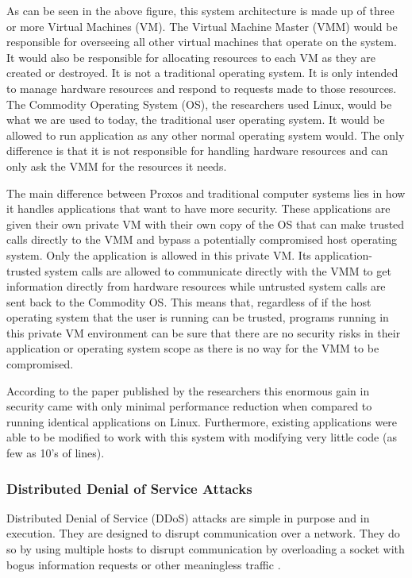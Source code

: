 \documentclass[conference, 12pt]{IEEEtran}
\begin{document}
As can be seen in the above figure, this system architecture is made up of three or more Virtual Machines (VM). The Virtual Machine Master (VMM) would be responsible for overseeing all other virtual machines that operate on the system. It would also be responsible for allocating resources to each VM as they are created or destroyed\cite{Richard}. It is not a traditional operating system. It is only intended to manage hardware resources and respond to requests made to those resources. The Commodity Operating System (OS), the researchers used Linux, would be what we are used to today, the traditional user operating system. It would be allowed to run application as any other normal operating system would. The only difference is that it is not responsible for handling hardware resources and can only ask the VMM for the resources it needs\cite{Richard}.

The main difference between Proxos and traditional computer systems lies in how it handles applications that want to have more security. These applications are given their own private VM with their own copy of the OS that can make trusted calls directly to the VMM and bypass a potentially compromised host operating system. Only the application is allowed in this private VM. Its application-trusted system calls are allowed to communicate directly with the VMM to get information directly from hardware resources while untrusted system calls are sent back to the Commodity OS\cite{Richard}. This means that, regardless of if the host operating system that the user is running can be trusted, programs running in this private VM environment can be sure that there are no security risks in their application or operating system scope as there is no way for the VMM to be compromised.

According to the paper published by the researchers this enormous gain in security came with only minimal performance reduction when compared to running identical applications on Linux. Furthermore, existing applications were able to be modified to work with this system with modifying very little code (as few as 10’s of lines).

\subsubsection{Distributed Denial of Service Attacks}
Distributed Denial of Service (DDoS) attacks are simple in purpose and in execution. They are designed to disrupt communication over a network. They do so by using multiple hosts to disrupt communication by overloading a socket with bogus information requests or other meaningless traffic \cite{Herbert}.
\end{document}
